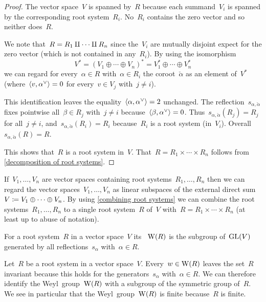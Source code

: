 \begin{proof}
  The vector space~$V$ is spanned by~$R$ because each summand~$V_i$ is spanned by the corresponding root system~$R_i$.
  No~$R_i$ contains the zero vector and so neither does~$R$.
  
  We note that~$R = R_1 \amalg \dotsb \amalg R_n$ since the~$V_i$ are mutually disjoint expect for the zero vector (which is not contained in any~$R_i$).
  By using the isomorphism
  \[
    V^*
    =
    (V_1 \oplus \dotsb \oplus V_n)^*
    =
    V_1^* \oplus \dotsb \oplus V_n^*
  \]
  we can regard for every~$\alpha \in R$ with~$\alpha \in R_i$ the coroot~$\check{\alpha}$ as an element of~$V^*$ (where~$\pair{v, \check{\alpha}} = 0$ for every~$v \in V_j$ with~$j \neq i$).
  
  This identification leaves the equality~$\pair{\alpha, \check{\alpha}} = 2$ unchanged.
  The reflection~$s_{\alpha, \check{\alpha}}$ fixes pointwise all~$\beta \in R_j$ with~$j \neq i$ because~$\pair{\beta, \check{\alpha}} = 0$.
  Thus~$s_{\alpha, \check{\alpha}}(R_j) = R_j$ for all~$j \neq i$, and~$s_{\alpha, \check{\alpha}}(R_i) = R_i$ because~$R_i$ is a root system (in~$V_i$).
  Overall~$s_{\alpha, \check{\alpha}}(R) = R$.
  
  This shows that~$R$ is a root system in~$V$.
  That~$R = R_1 \times \dotsb \times R_n$ follows from \cref{decomposition of root systems}.
\end{proof}


\begin{example}
  If~$V_1, \dotsc, V_n$ are vector spaces containing root systems~$R_1, \dotsc, R_n$ then we can regard the vector spaces~$V_1, \dotsc, V_n$ as linear subspaces of the external direct sum~$V \coloneqq V_1 \oplus \dotsb \oplus V_n$.
  By using \cref{combining root systems} we can combine the root systems~$R_1, \dotsc, R_n$ to a single root system~$R$ of~$V$ with~$R = R_1 \times \dotsb \times R_n$ (at least up to abuse of notation).
\end{example}


\begin{definition}
  For a root system~$R$ in a vector space~$V$ its ~$\operatorname{W}(R)$ is the subgroup of~$\operatorname{GL}(V)$ generated by all reflections~$s_\alpha$ with~$\alpha \in R$.
\end{definition}


\begin{remark}
  Let~$R$ be a root system in a vector space~$V$.
  Every~$w \in \operatorname{W}(R)$ leaves the set~$R$ invariant because this holds for the generators~$s_\alpha$ with~$\alpha \in R$.
  We can therefore identify the Weyl~group~$\operatorname{W}(R)$ with a subgroup of the symmetric group of~$R$.
  We see in particular that the Weyl~group~$\operatorname{W}(R)$ is finite because~$R$ is finite.
\end{remark}



